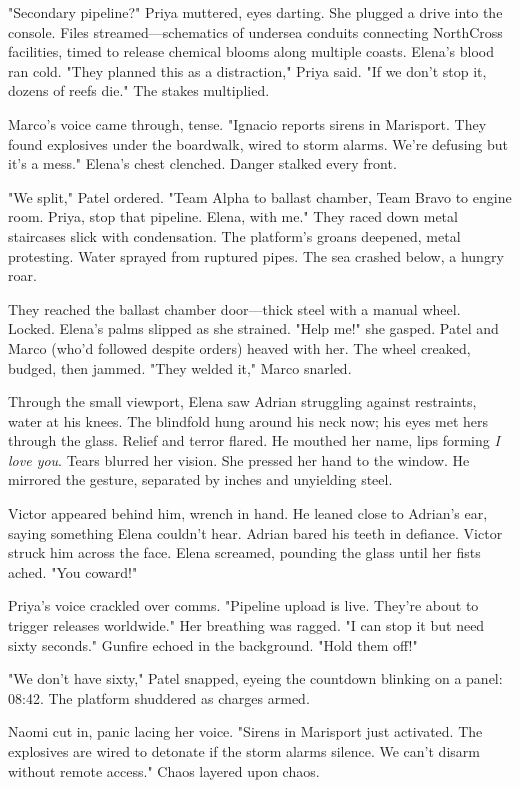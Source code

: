 "Secondary pipeline?" Priya muttered, eyes darting. She plugged a drive into the console. Files streamed—schematics of undersea conduits connecting NorthCross facilities, timed to release chemical blooms along multiple coasts. Elena's blood ran cold. "They planned this as a distraction," Priya said. "If we don't stop it, dozens of reefs die." The stakes multiplied.

Marco's voice came through, tense. "Ignacio reports sirens in Marisport. They found explosives under the boardwalk, wired to storm alarms. We're defusing but it's a mess." Elena's chest clenched. Danger stalked every front.

"We split," Patel ordered. "Team Alpha to ballast chamber, Team Bravo to engine room. Priya, stop that pipeline. Elena, with me." They raced down metal staircases slick with condensation. The platform's groans deepened, metal protesting. Water sprayed from ruptured pipes. The sea crashed below, a hungry roar.

They reached the ballast chamber door—thick steel with a manual wheel. Locked. Elena's palms slipped as she strained. "Help me!" she gasped. Patel and Marco (who'd followed despite orders) heaved with her. The wheel creaked, budged, then jammed. "They welded it," Marco snarled.

Through the small viewport, Elena saw Adrian struggling against restraints, water at his knees. The blindfold hung around his neck now; his eyes met hers through the glass. Relief and terror flared. He mouthed her name, lips forming \textit{I love you}. Tears blurred her vision. She pressed her hand to the window. He mirrored the gesture, separated by inches and unyielding steel.

Victor appeared behind him, wrench in hand. He leaned close to Adrian's ear, saying something Elena couldn't hear. Adrian bared his teeth in defiance. Victor struck him across the face. Elena screamed, pounding the glass until her fists ached. "You coward!"

Priya's voice crackled over comms. "Pipeline upload is live. They're about to trigger releases worldwide." Her breathing was ragged. "I can stop it but need sixty seconds." Gunfire echoed in the background. "Hold them off!"

"We don't have sixty," Patel snapped, eyeing the countdown blinking on a panel: 08:42. The platform shuddered as charges armed.

Naomi cut in, panic lacing her voice. "Sirens in Marisport just activated. The explosives are wired to detonate if the storm alarms silence. We can't disarm without remote access." Chaos layered upon chaos.

